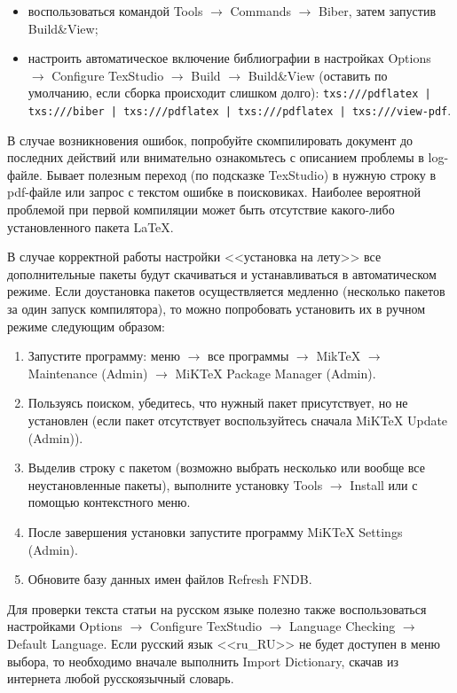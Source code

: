 \begin{enumerate}
	\begin{itemize}
		\item воспользоваться командой Tools $\to$ Commands $\to$ Biber, затем запустив Build\&View;
		
		\item настроить автоматическое включение библиографии в настройках Options $\to$ Configure TexStudio $\to$ Build $\to$  Build\&View (оставить по умолчанию, если сборка происходит слишком долго): \texttt{txs:///pdflatex | txs:///biber | txs:///pdflatex | txs:///pdflatex | txs:///\-view-pdf}.
	\end{itemize}
	
\end{enumerate}

В случае возникновения ошибок, попробуйте скомпилировать документ до последних действий или внимательно ознакомьтесь с описанием проблемы в log-файле. Бывает полезным переход (по подсказке TexStudio) в нужную строку в pdf-файле или запрос с текстом ошибке в поисковиках. Наиболее вероятной проблемой при первой компиляции может быть отсутствие какого-либо установленного пакета \LaTeX. 

В случае корректной работы настройки <<установка на лету>> все дополнительные пакеты будут скачиваться и устанавливаться в автоматическом режиме. Если доустановка пакетов осуществляется медленно (несколько пакетов за один запуск компилятора), то можно попробовать установить их в ручном режиме следующим образом:

\begin{enumerate}[1.]
	\item Запустите программу: меню $\to$ все программы $\to$ MikTeX $\to$ Maintenance (Admin) $\to$ MiKTeX Package Manager (Admin).
	\item Пользуясь поиском, убедитесь, что нужный пакет присутствует, но не установлен (если пакет отсутствует воспользуйтесь сначала MiKTeX Update (Admin)).
	\item Выделив строку с пакетом (возможно выбрать несколько или вообще все неустановленные пакеты), выполните установку Tools $\to$ Install или с помощью контекстного меню.
	\item После завершения установки запустите программу MiKTeX Settings (Admin).
	\item Обновите базу данных имен файлов Refresh FNDB.
\end{enumerate}


Для проверки текста статьи на русском языке полезно также воспользоваться настройками Options $\to$ Configure TexStudio $\to$ Language Checking $\to$  Default Language. Если русский язык <<ru\_RU>> не будет доступен в меню выбора, то необходимо вначале выполнить Import Dictionary, скачав из интернета любой русскоязычный словарь. 


